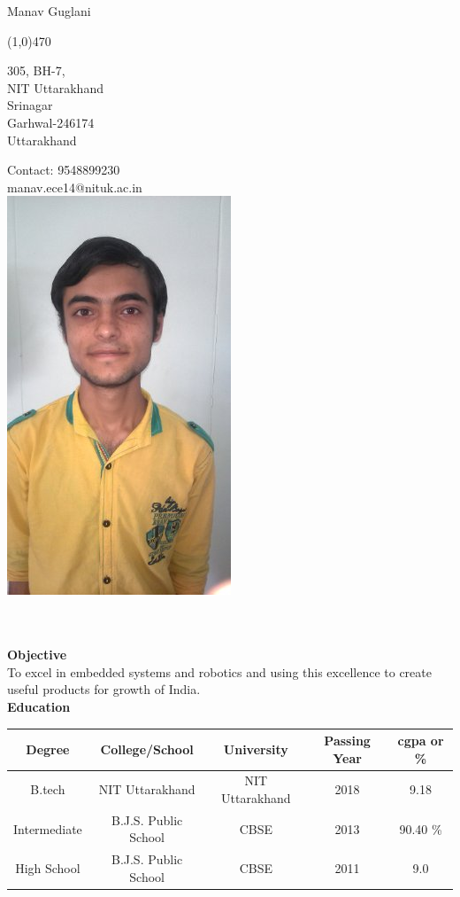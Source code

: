 \documentclass[11pt]{article} %
\begin{document}
\centerline{\Large Manav Guglani}  %
\noindent %
\line(1,0){470}
\\  %
 \parbox[t]{5cm}
{305, BH-7,\\
	NIT Uttarakhand\\
	Srinagar \\
	Garhwal-246174\\
	Uttarakhand}
\hspace{7cm}
\parbox[t]{3.5cm}
{Contact: 9548899230\\
	manav.ece14@nituk.ac.in\\
	\vspace{1pt}
	\includegraphics[scale=.2]{manav.jpg}
}\\ \\
 \Large{ \bf Objective} \\
To excel in embedded systems and robotics and using this excellence to create useful products for growth of India.\\ 
\Large{\bf Education} \\
\begin{tabular}{|c|c|c|c|c|}
	\hline
	Degree & College/School & University & Passing Year & cgpa or \% \\
	\hline
	B.tech & NIT Uttarakhand & NIT Uttarakhand & 2018 & 9.18\\
	\hline
		Intermediate & B.J.S. Public School & CBSE & 2013 & 90.40 \% \\
	\hline
	High School & B.J.S. Public School & CBSE & 2011 & 9.0 \\
	\hline
\end{tabular} \\ \\
\end{document}
